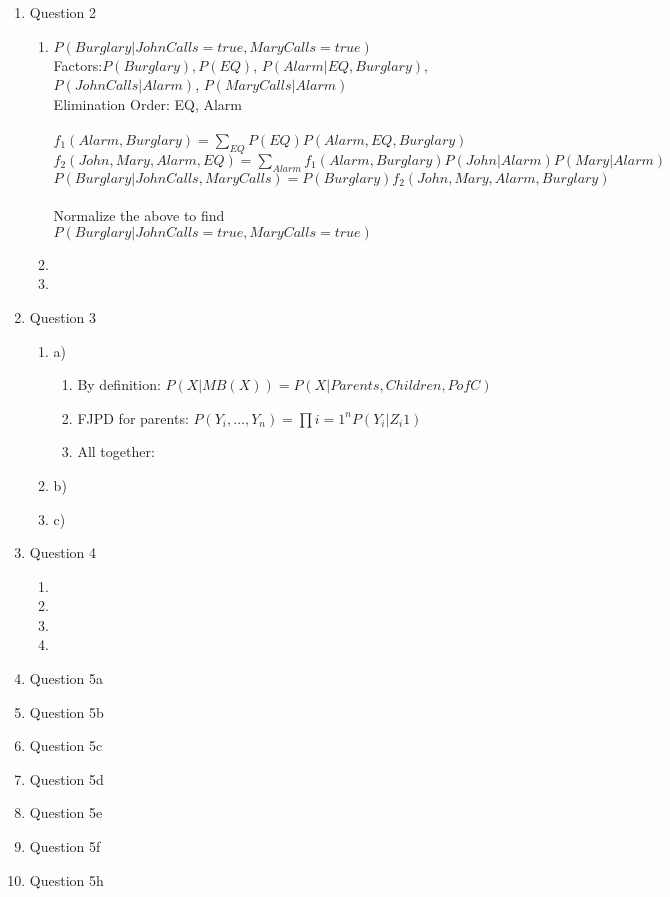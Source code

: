 \documentclass[11pt]{article}
\begin{document}
\begin{enumerate}
\begin{enumerate}
\end{enumerate}

\item Question 2
\begin{enumerate}
\item $P(Burglary|JohnCalls = true, MaryCalls = true)$
\\Factors:$ P(Burglary), P(EQ)$, $P(Alarm|EQ, Burglary)$,$ P(JohnCalls|Alarm)$, $P(MaryCalls|Alarm)$
\\Elimination Order: EQ, Alarm
\\
\\$f_{1}(Alarm, Burglary) = \sum_{EQ} P(EQ) P(Alarm, EQ, Burglary)$
\\$f_{2}(John, Mary, Alarm, EQ) = \sum_{Alarm}f_{1}(Alarm,Burglary)P(John|Alarm)P(Mary|Alarm)$
\\$P(Burglary|JohnCalls,MaryCalls) = P(Burglary)f_{2}(John, Mary, Alarm, Burglary)$
\\
\\Normalize the above to find $P(Burglary|JohnCalls = true, MaryCalls = true)$
\item
\item
\end {enumerate}

\item Question 3
\begin{enumerate}
\item a) 
\begin{enumerate}
\item By definition: $P(X|MB(X)) = P(X|Parents,Children,PofC) $
\item FJPD for parents: $P(Y_i, ..., Y_n) = \prod{i = 1}^{n} P(Y_i | Z_{i}1)$ 
\item All together: 
\end{enumerate}
\item b)
\item c)
\end{enumerate}

\item Question 4
\begin {enumerate}
\item
\item
\item
\item
\end {enumerate}

\item Question 5a

\item Question 5b

\item Question 5c

\item Question 5d

\item Question 5e

\item Question 5f

\item Question 5h

\end{enumerate}
\end{document}
